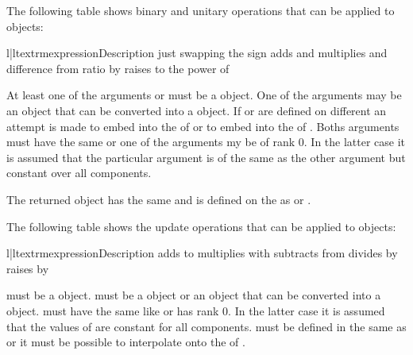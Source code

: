 The following table shows binary and unitary operations that can be applied to
\Data objects:
\begin{tableii}{l|l}{textrm}{expression}{Description}
 {just  \index{+}}
 {swapping the sign\index{-}}
 {adds  and  \index{+}}
 {multiplies  and  \index{*}}
 {difference  from \index{-}}
 {ratio  by  \index{/}}
 {raises  to the power of  \index{**}}
\end{tableii}
At least one of the arguments  or  must be a
\Data object. One of the arguments may be an object that can be
converted into a \Data object. If  or  are
defined on different \FunctionSpace an attempt is made to embed 
into the \FunctionSpace of  or to embed  into
the \FunctionSpace of . Boths arguments must have the same
\Shape or one of the arguments my be of rank 0. In the
latter case it is assumed that the particular argument is of the same
\Shape as the other argument but constant over all components.

The returned \Data object has the same \Shape and is defined on
the \DataSamplePoints as  or .

The following table shows the update operations that can be applied to
\Data objects:
\begin{tableii}{l|l}{textrm}{expression}{Description}
 {adds  to  \index{+}}
 {multiplies  with  \index{*}}
 {subtracts  from \index{-}}
 {divides  by  \index{/}}
 {raises  by  \index{**}}
\end{tableii}
 must be a \Data object.  must be a
\Data object or an object that can be converted into a
\Data object.  must have the same \Shape like
 or has rank 0.  In the latter case it is
assumed that the values of  are constant for all
components.  must be defined in the same \FunctionSpace as
 or it must be possible to interpolate  onto the
\FunctionSpace of .

